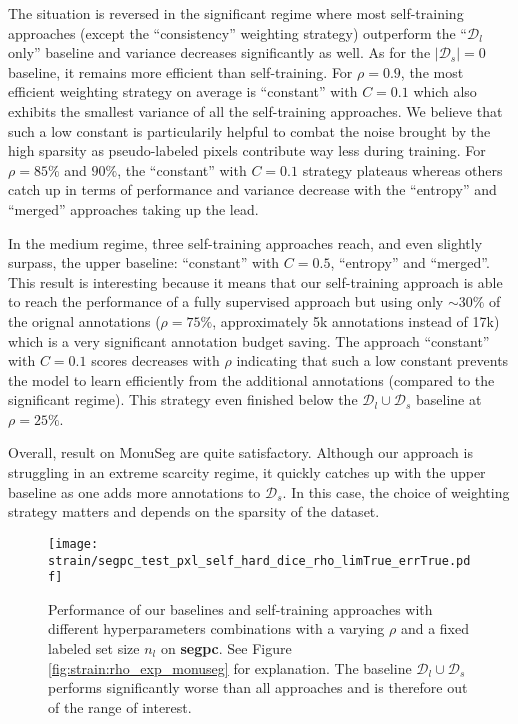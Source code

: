 The situation is reversed in the significant regime where most self-training approaches (except the ``consistency'' weighting strategy) outperform the ``$\mathcal{D}_l$ only'' baseline and variance decreases significantly as well. As for the $|\mathcal{D}_s| = 0$ baseline, it remains more efficient than self-training. For $\rho = 0.9$, the most efficient weighting strategy on average is ``constant'' with $C = 0.1$ which also exhibits the smallest variance of all the self-training approaches. We believe that such a low constant is particularily helpful to combat the noise brought by the high sparsity as pseudo-labeled pixels contribute way less during training. For $\rho = 85\%$ and $90\%$, the ``constant'' with $C = 0.1$ strategy plateaus whereas others catch up in terms of performance and variance decrease with the ``entropy'' and ``merged'' approaches taking up the lead.

In the medium regime, three self-training approaches reach, and even slightly surpass, the upper baseline: ``constant'' with $C = 0.5$, ``entropy'' and ``merged''. This result is interesting because it means that our self-training approach is able to reach the performance of a fully supervised approach but using only $\sim 30\%$ of the orignal annotations (\ie $\rho = 75\%$, approximately 5k annotations instead of 17k) which is a very significant annotation budget saving. The approach ``constant'' with $C=0.1$ scores decreases with $\rho$ indicating that such a low constant prevents the model to learn efficiently from the additional annotations (compared to the significant regime). This strategy even finished below the $\mathcal{D}_l \cup \mathcal{D}_s$ baseline at $\rho = 25\%$. 

Overall, result on MonuSeg are quite satisfactory. Although our approach is struggling in an extreme scarcity regime, it quickly catches up with the upper baseline as one adds more annotations to $\mathcal{D}_s$. In this case, the choice of weighting strategy matters and depends on the sparsity of the dataset.

\begin{figure}
  \centering
  \texttt{[image: strain/segpc\_test\_pxl\_self\_hard\_dice\_rho\_limTrue\_errTrue.pdf]}
  \caption{Performance of our baselines and self-training approaches with different hyperparameters combinations with a varying $\rho$ and a fixed labeled set size $n_l$ on \textbf{\acrshort{segpc}}. See Figure \ref{fig:strain:rho_exp_monuseg} for explanation. The baseline $\mathcal{D}_l \cup \mathcal{D}_s$ performs significantly worse than all approaches and is therefore out of the range of interest. }
  \label{fig:strain:rho_exp_segpc}
\end{figure}

